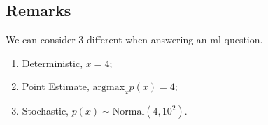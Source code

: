 \documentclass[11pt,a4paper]{article}
\begin{document}
\subsection{Remarks}

We can consider 3 different when answering an ml question.
\begin{enumerate}[label=\roman*)]
	\item Deterministic, $x=4$;
	\item Point Estimate, $\text{argmax}_xp(x)=4$;
	\item Stochastic, $p(x)\sim\text{Normal}(4,10^2)$.
\end{enumerate}
\end{document}
